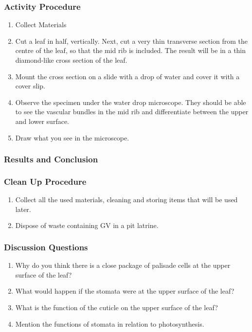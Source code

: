 \subsubsection*{Activity Procedure}
\begin{enumerate}
\item{Collect Materials}
\item{Cut a leaf in half, vertically. Next, cut a very thin transverse section from the centre of the leaf, so that the mid rib is included. The result will be in a thin diamond-like cross section of the leaf.}
\item{Mount the cross section on a slide with a drop of water and cover it with a cover slip.}
\item{Observe the specimen under the water drop microscope. They should be able to see the vascular bundles in the mid rib and differentiate between the upper and lower surface.}
\item{Draw what you see in the microscope.}
\end{enumerate}

\subsubsection*{Results and Conclusion}


\subsubsection*{Clean Up Procedure}
\begin{enumerate}
\item{Collect all the used materials, cleaning and storing items that will be used later.}
\item{Dispose of waste containing GV in a pit latrine.}
\end{enumerate}

\subsubsection*{Discussion Questions}
\begin{enumerate}
\item{Why do you think there is a close package of palisade cells at the upper surface of the leaf?}
\item{What would happen if the stomata were at the upper surface of the leaf?}
\item{What is the function of the cuticle on the upper surface of the leaf?}
\item{Mention the functions of stomata in relation to photosynthesis.}
\end{enumerate}

